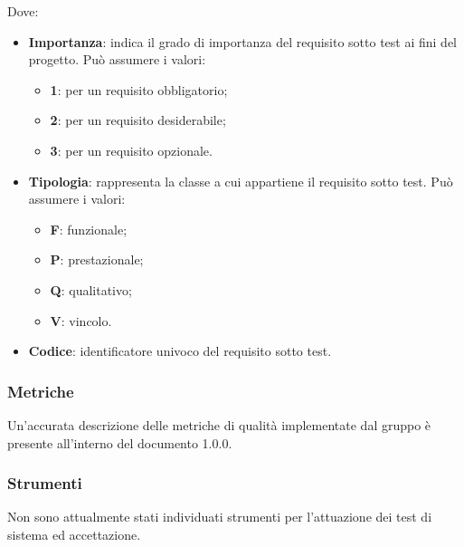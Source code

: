       Dove:
      \begin{itemize}
      	\item{\textbf{Importanza}: indica il grado di importanza del requisito sotto test ai fini del progetto. Può assumere i valori:}
      	\begin{itemize}
      		\item{\textbf{1}: per un requisito obbligatorio;}
      		\item{\textbf{2}: per un requisito desiderabile;}
      		\item{\textbf{3}: per un requisito opzionale.}
      	\end{itemize}
      	
      	\item{\textbf{Tipologia}: rappresenta la classe a cui appartiene il requisito sotto test. Può assumere i valori:}
      	\begin{itemize}
      		\item{\textbf{F}: funzionale;}
      		\item{\textbf{P}: prestazionale;}
      		\item{\textbf{Q}: qualitativo;}
      		\item{\textbf{V}: vincolo.}
      	\end{itemize}
      	
      	\item{\textbf{Codice}: identificatore univoco del requisito sotto test}.
      \end{itemize}
    \subsubsection{Metriche}
    Un'accurata descrizione delle metriche di qualità implementate dal gruppo è presente all'interno del documento \PdQ{} 1.0.0.
    \subsubsection{Strumenti}
    Non sono attualmente stati individuati strumenti per l'attuazione dei test di sistema ed accettazione.
